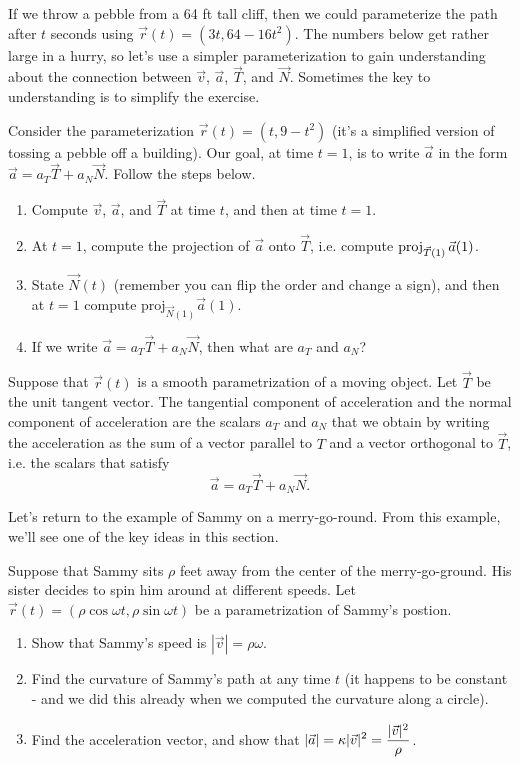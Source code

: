 If we throw a pebble from a 64 ft tall cliff, then we could parameterize the path after $t$ seconds using $\vec r(t) = (3t,64-16t^2)$. The numbers below get rather large in a hurry, so let's use a simpler parameterization to gain understanding about the connection between $\vec v$, $\vec a$, $\vec T$, and $\vec N$.  Sometimes the key to understanding is to simplify the exercise.
\begin{problem}
Consider the parameterization $\vec r(t) = (t,9-t^2)$ (it's a simplified version of tossing a pebble off a building). Our goal, at time $t=1$, is to write $\vec a$ in the form $\vec a = a_T\vec T+a_N\vec N.$ Follow the steps below.
\begin{enumerate}
	\item Compute $\vec v$, $\vec a$, and $\vec T$ at time $t$, and then at time $t=1$. 
	\item At $t=1$, compute the projection of $\vec a$ onto $\vec T$, i.e. compute $\operatorname{proj}_{\vec T(1)}\vec a(1)$.
	\item State $\vec N(t)$ (remember you can flip the order and change a sign), and then at $t=1$ compute $\text{proj}_{\vec N(1)}\vec a(1)$. 
	\item If we write $\vec a = a_T\vec T +a_N\vec N$, then what are $a_T$ and $a_N$?
\end{enumerate}
  
\end{problem}



\begin{definition}
 Suppose that $\vec r(t)$ is a smooth parametrization of a moving object.  Let $\vec T$ be the unit tangent vector. The tangential component of acceleration and the normal component of acceleration are the scalars $a_T$ and $a_N$ that we obtain by writing the acceleration as the sum of a vector parallel to $T$ and a vector orthogonal to $\vec T$, i.e. the scalars that satisfy
$$\vec a = a_T\vec T+a_N\vec N.$$
\end{definition}

Let's return to the example of Sammy on a merry-go-round.  From this example, we'll see one of the key ideas in this section.
\begin{problem*}
 Suppose that Sammy sits $\rho$ feet away from the center of the merry-go-ground. His sister decides to spin him around at different speeds.  Let $\vec r(t) = (\rho \cos \omega t, \rho \sin \omega t)$ be a parametrization of Sammy's postion.
\begin{enumerate}
 \item Show that Sammy's speed is $|\vec v|=\rho \omega$.  
 \item Find the curvature of Sammy's path at any time $t$ (it happens to be constant - and we did this already when we computed the curvature along a circle).
 \item Find the acceleration vector, and show that $\displaystyle |\vec a| = \kappa |\vec v|^2 = \frac{|\vec v|^2}{\rho}$.
\end{enumerate}
\end{problem*}

